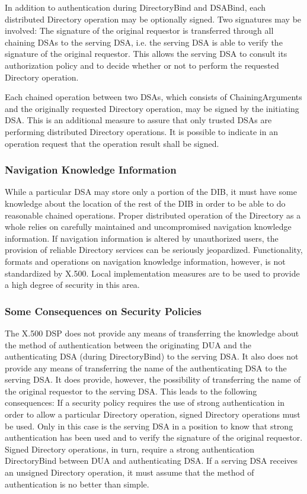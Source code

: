 In addition to authentication during DirectoryBind and DSABind, each distributed 
Directory operation may be optionally signed. Two signatures may be involved:
\be
\m The signature of the original requestor is transferred through all chaining DSAs 
   to the serving DSA, i.e. the serving DSA is able to verify the signature of 
   the original requestor. This allows the serving DSA to consult its authorization 
   policy and to decide whether or not to perform the requested Directory operation.

\m Each chained operation between two DSAs, which consists of ChainingArguments and 
   the originally requested Directory operation, may be signed by the initiating
   DSA. This is an additional measure to assure that only trusted DSAs are 
   performing distributed Directory operations.
\ee
It is possible to indicate in an operation request that the operation result
shall be signed.


\subsubsection{Navigation Knowledge Information}


While a particular DSA may store only a portion of the DIB, it must have some 
knowledge about the location of the rest of the DIB in order to be able to do 
reasonable chained operations. Proper distributed operation of the Directory as 
a whole relies on carefully maintained and uncompromised navigation knowledge 
information. If navigation information is altered by unauthorized users,
the provision of reliable Directory services can be seriously jeopardized.
Functionality, formats and operations on navigation knowledge information,
however, is not standardized by X.500. Local implementation measures are to
be used to provide a high degree of security in this area.


\subsubsection{Some Consequences on Security Policies}


The X.500 DSP does not provide any means of transferring the knowledge about the
method of authentication between the originating DUA and the authenticating DSA
(during DirectoryBind) to the serving DSA. It also does not provide any means
of transferring the name of the authenticating DSA to the serving DSA. It does provide,
however, the possibility of transferring the name of the original requestor to the
serving DSA. This leads to the following consequences:
\bi
\m If a security policy requires the use of strong authentication in order to
  allow a particular Directory operation, signed Directory operations must be
  used. Only in this case is the serving DSA  in a position to know that strong
  authentication has been used and to verify the signature of the original 
  requestor. Signed Directory operations, in turn, require a strong authentication
  DirectoryBind between DUA and authenticating DSA. If a serving DSA receives an 
  unsigned Directory operation, it must assume that the method of authentication 
  is no better than simple.

